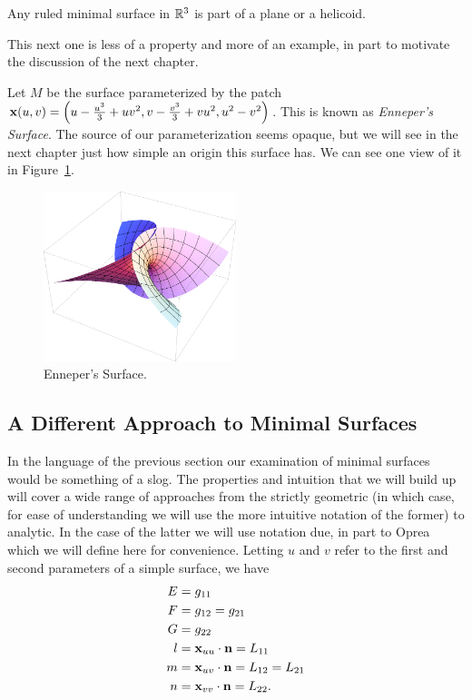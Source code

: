   \begin{thm}
    Any ruled minimal surface in $\mathbb{R}^3$ is part of a plane or a helicoid.
  \end{thm}

  This next one is less of a property and more of an example, in part to motivate the discussion of the next chapter.

  \begin{ex}
    \label{ex:ennepers_surface}
    Let $M$ be the surface parameterized by the patch $\mathbf{x}(u, v) = \left(u - \frac{u^3}{3} + uv^2, v - \frac{v^3}{3} + vu^2, u^2 - v^2\right)$. This is known as \emph{Enneper's Surface}. The source of our parameterization seems opaque, but we will see in the next chapter just how simple an origin this surface has. We can see one view of it in Figure~\ref{fig:ennepers_surface}.

    \begin{figure}[t] %
      \centering
      \includegraphics[width=0.5\textwidth]{figures/ennepers_surface.pdf}
      \caption{Enneper's Surface.}
      \label{fig:ennepers_surface}
    \end{figure}
  \end{ex}

\subsection{A Different Approach to Minimal Surfaces}
  \label{ss:opreaSrf}
  In the language of the previous section our examination of minimal surfaces would be something of a slog. The properties and intuition that we will build up will cover a wide range of approaches from the strictly geometric (in which case, for ease of understanding we will use the more intuitive notation of the former) to analytic. In the case of the latter we will use notation due, in part to Oprea which we will define here for convenience. Letting $u$ and $v$ refer to the first and second parameters of a simple surface, we have
  \begin{align*}
    E &= g_{11}\\
    F &= g_{12} = g_{21}\\
    G &= g_{22}\\
    l &= \mathbf{x}_{uu}\cdot \mathbf{n} = L_{11}\\
    m &= \mathbf{x}_{uv}\cdot \mathbf{n} = L_{12} = L_{21}\\
    n &= \mathbf{x}_{vv}\cdot \mathbf{n} = L_{22}.
  \end{align*}

